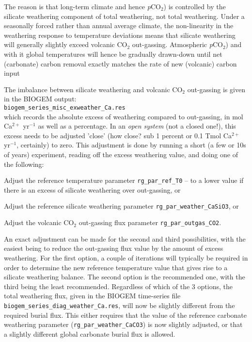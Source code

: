 \documentclass[10pt,twoside]{article}
\begin{document}
The reason is that long-term climate and hence \textit{p}CO${_2}$) is controlled by the silicate weathering component of total weathering, not total weathering. Under a seasonally forced rather than annual average climate, the non-linearity in the weathering response to temperature deviations means that silicate weathering will generally slightly exceed volcanic CO$_{2}$ out-gassing. Atmospheric \textit{p}CO${_2}$) and with it  global temperatures will hence be gradually drawn-down until net (carbonate) carbon removal exactly matches the rate of new (volcanic) carbon input

The imbalance between silicate weathering and volcanic CO$_{2}$ out-gassing is given in the BIOGEM output:
\\\texttt{biogem\_series\_misc\_exweather\_Ca.res}
\\which records the absolute excess of weathering compared to out-gassing, in mol Ca$^{2+}$ yr$^{-1}$ as well as a percentage. In an \textit{open system} (not a closed one!), this excess needs to be adjusted 'close' (how close? sub 1 percent or 0.1 Tmol Ca$^{2+}$ yr$^{-1}$, certainly) to zero. This adjustment is done by running a short (a few or 10s of years) experiment, reading off the excess weathering value, and doing one of the following:

\begin{compactenum}
\item Adjust the reference temperature parameter \texttt{rg\_par\_ref\_T0} -- to a lower value if there is an excess of silicate weathering over out-gassing, or
\item Adjust the reference silicate weathering parameter \texttt{rg\_par\_weather\_CaSiO3}, or
\item Adjust the volcanic CO$_{2}$ out-gassing flux parameter \texttt{rg\_par\_outgas\_CO2}.
\end{compactenum}
An exact adjustment can be made for the second and third possibilities, with the easiest being to reduce the out-gassing flux value by the amount of excess weathering. For the first option, a couple of iterations will typically be required in order to determine the new reference temperature value that gives rise to a silicate weathering balance. The second option is the recommended one, with the third being the least recommended.
Regardless of which of the 3 options, the total weathering flux, given in the BIOGEM time-series file \texttt{biogem\_series\_diag\_weather\_Ca.res}, will now be slightly different from the required burial flux. This either requires that the value of the reference carbonate weathering parameter (\texttt{rg\_par\_weather\_CaCO3}) is now slightly adjusted, or that a slightly different global carbonate burial flux is allowed.
\end{document}
